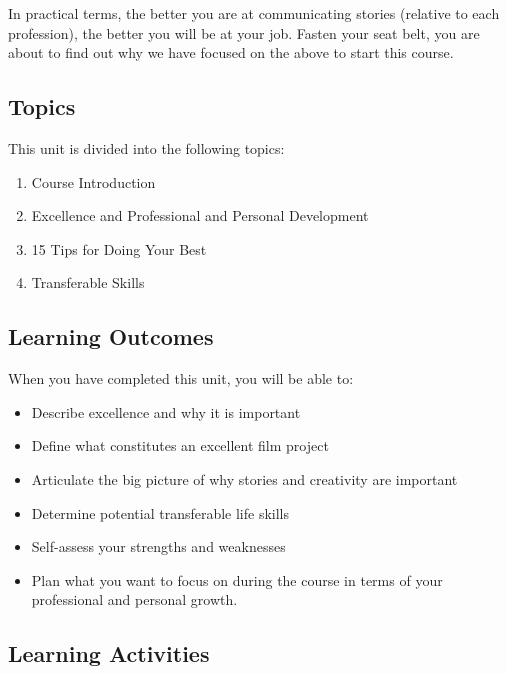 \documentclass[
  letterpaper,
  DIV=11,
  numbers=noendperiod]{scrreprt}
\providecommand{\tightlist}{%
  \setlength{\itemsep}{0pt}\setlength{\parskip}{0pt}}\usepackage{longtable,booktabs,array}
\begin{document}
In practical terms, the better you are at communicating stories
(relative to each profession), the better you will be at your job.
Fasten your seat belt, you are about to find out why we have focused on
the above to start this course.

\subsection*{Topics}\label{topics}

This unit is divided into the following topics:

\begin{enumerate}
\def\labelenumi{\arabic{enumi}.}
\tightlist
\item
  Course Introduction
\item
  Excellence and Professional and Personal Development
\item
  15 Tips for Doing Your Best
\item
  Transferable Skills
\end{enumerate}

\subsection*{Learning Outcomes}\label{learning-outcomes}

When you have completed this unit, you will be able to:

\begin{itemize}
\tightlist
\item
  Describe excellence and why it is important
\item
  Define what constitutes an excellent film project
\item
  Articulate the big picture of why stories and creativity are important
\item
  Determine potential transferable life skills
\item
  Self-assess your strengths and weaknesses
\item
  Plan what you want to focus on during the course in terms of your
  professional and personal growth.
\end{itemize}

\subsection*{Learning Activities}\label{learning-activities}
\end{document}

